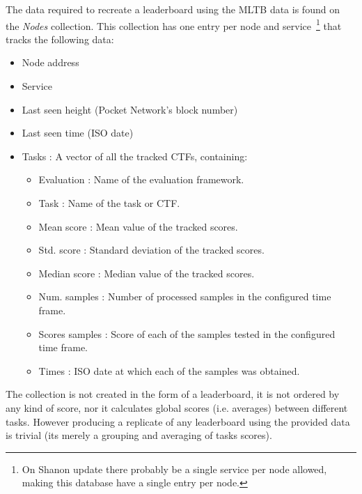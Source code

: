 The data required to recreate a leaderboard using the \gls{MLTB} data is found on the \emph{Nodes} collection. This collection has one entry per node and service~\footnote{On Shanon update there probably be a single service per node allowed, making this database have a single entry per node.} that tracks the following data:
\begin{itemize}
    \item Node address
    \item Service
    \item Last seen height (Pocket Network's block number)
    \item Last seen time (ISO date)
    \item Tasks : A vector of all the tracked \gls{CTF}s, containing:
    \begin{itemize}
        \item Evaluation : Name of the evaluation framework.
        \item Task : Name of the task or \gls{CTF}.
        \item Mean score : Mean value of the tracked scores.
        \item Std. score : Standard deviation of the tracked scores.
        \item Median score : Median value of the tracked scores.
        \item Num. samples : Number of processed samples in the configured time frame.
        \item Scores samples : Score of each of the samples tested in the configured time frame.
        \item Times : ISO date at which each of the samples was obtained.
    \end{itemize}
\end{itemize}

The collection is not created in the form of a leaderboard, it is not ordered by any kind of score, nor it calculates global scores (i.e. averages) between different tasks. However producing a replicate of any leaderboard using the provided data is trivial (its merely a grouping and averaging of tasks scores).

